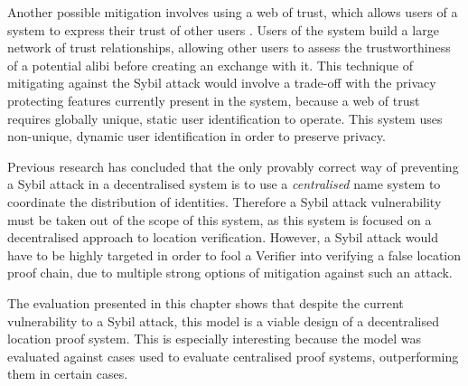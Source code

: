 Another possible mitigation involves using a web of trust, which  allows users of a system to express their trust of other users \cite{weboftrust}. Users of the system build a large network of trust relationships, allowing other users to assess the trustworthiness of a potential alibi before creating an exchange with it. This technique of mitigating against the Sybil attack would involve a trade-off with the privacy protecting features currently present in the system, because a web of trust requires globally unique, static user identification to operate. This system uses non-unique, dynamic user identification in order to preserve privacy.

Previous research \cite{sybil} has concluded that the only provably correct way of preventing a Sybil attack in a decentralised system is to use a \textit{centralised} name system to coordinate the distribution of identities. Therefore a Sybil attack vulnerability must be taken out of the scope of this system, as this system is focused on a decentralised approach to location verification. However, a Sybil attack would have to be highly targeted in order to fool a Verifier into verifying a false location proof chain, due to multiple strong options of mitigation against such an attack.

\null
The evaluation presented in this chapter shows that despite the current vulnerability to a Sybil attack, this model is a viable design of a decentralised location proof system. This is especially interesting because the model was evaluated against cases used to evaluate centralised proof systems, outperforming them in certain cases.